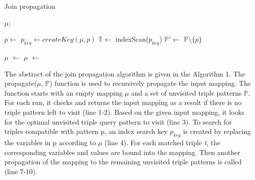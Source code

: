 \begin{algorithm}[ht!]
\label{alg:jp}
\caption{Join propagation}
     
    
           
    
    {
      	\Return $\mu$;
    }
    
    $p    \leftarrow$ \;
    $p_{key}     \leftarrow  createKey(\mu, p)$\;
	$\mathbb{T}  \leftarrow$ indexScan($p_{key}$)\;
    $\mathbb{P}' \leftarrow$ $\mathbb{P}\setminus\{p\}$\;
    
    {
    	$\mu$ $\leftarrow$ \;
      	\;
        $\mu$ $\leftarrow$ \;
    }
\end{algorithm}


The abstract of the join propagation algorithm is given in the Algorithm 1. The propagate($\mu$, $\mathbb{P}$) function  is used to recursively propagate the input mapping. 
The function starts with an empty mapping $\mu$ and a set of unvisited triple patterns $\mathbb{P}$.
For each run, it checks and returns the input mapping as a result if there is no triple pattern left to visit (line 1-2). Based on the given input mapping, it looks for the optimal unvisited triple query pattern to visit (line 3). 
To search for triples compatible with pattern p, an index search key $p_{key}$ is created by replacing the variables in p according to $\mu$ (line 4). 
For each matched triple \textit{t}, the corresponding variables and values are bound into the mapping. Then another propagation of the mapping to the remaining unvisited triple patterns is called (line 7-10).

